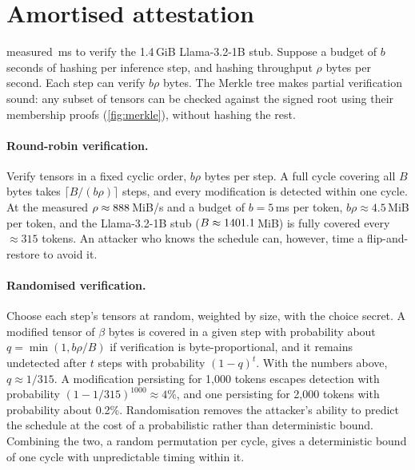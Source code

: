 \section{Amortised attestation}
\label{sec:disc:amortise}

 measured \MerkVerLlamaPB{}\,ms to verify the 1.4\,GiB Llama-3.2-1B stub.
Suppose a budget of $b$ seconds of hashing per inference step, and hashing throughput $\rho$
bytes per second. Each step can verify $b\rho$ bytes. The Merkle tree makes partial verification
sound: any subset of tensors can be checked against the signed root using their membership
proofs (\cref{fig:merkle}), without hashing the rest.

\paragraph{Round-robin verification.} Verify tensors in a fixed cyclic order, $b\rho$ bytes per
step. A full cycle covering all $B$ bytes takes $\lceil B/(b\rho)\rceil$ steps, and every
modification is detected within one cycle. At the measured $\rho\approx888$\,MiB/s and a budget of
$b=5$\,ms per token, $b\rho\approx 4.5$\,MiB per token, and the Llama-3.2-1B stub
($B\approx1401.1$\,MiB) is fully covered every $\approx315$ tokens. An attacker who
knows the schedule can, however, time a flip-and-restore to avoid it.

\paragraph{Randomised verification.} Choose each step's tensors at random, weighted by size, with
the choice secret. A modified tensor of $\beta$ bytes is covered in a given step with probability
about $q = \min(1, b\rho/B)$ if verification is byte-proportional, and it remains undetected
after $t$ steps with probability $(1-q)^t$. With the numbers above, $q\approx 1/315$. A
modification persisting for 1{,}000 tokens escapes detection with probability
$(1-1/315)^{1000}\approx 4\%$, and one persisting for 2{,}000 tokens with probability about
0.2\%. Randomisation removes the attacker's ability to predict the schedule at the cost of a
probabilistic rather than deterministic bound. Combining the two, a random permutation per cycle,
gives a deterministic bound of one cycle with unpredictable timing within it.


